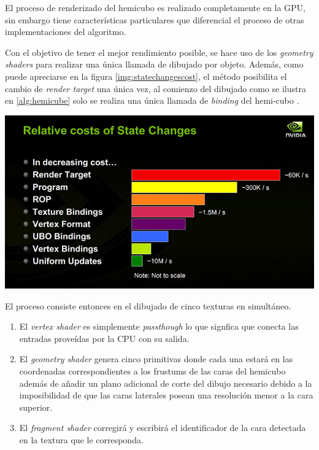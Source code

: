 El proceso de renderizado del hemicubo es realizado completamente en la GPU, sin embargo tiene características particulares que diferencial el proceso de otras implementaciones del algoritmo. 

Con el objetivo de tener el mejor rendimiento posible, se hace uso de los \textit{geometry shaders} para realizar una única llamada de dibujado por objeto. Además, como puede apreciarse en la figura \ref{img:statechangescost}, el método posibilita el cambio de \textit{render target} una única vez, al comienzo del dibujado como se ilustra en \ref{alg:hemicube} solo se realiza una única llamada de \textit{binding} del hemi-cubo .

\vspace{5mm}
\begin{minipage}[h]{\linewidth}
	\centering
	\includegraphics[width=\linewidth]{assets/statecosts}
	\label{img:statechangescost}
\end{minipage}

El proceso consiste entonces en el dibujado de cinco texturas en simultáneo. 

\begin{enumerate}
	\item El \textit{vertex shader} es simplemente \textit{passthough} lo que signfica que conecta las entradas proveídas por la CPU con su salida.
	\item El \textit{geometry shader} genera cinco primitivas donde cada una estará en las coordenadas correspondientes a los frustums de las caras del hemicubo además de añadir un plano adicional de corte del dibujo necesario debido a la imposibilidad de que las caras laterales posean una resolución menor a la cara superior.
	\item El \textit{fragment shader} corregirá y escribirá el identificador de la cara detectada en la textura que le corresponda.
\end{enumerate}

